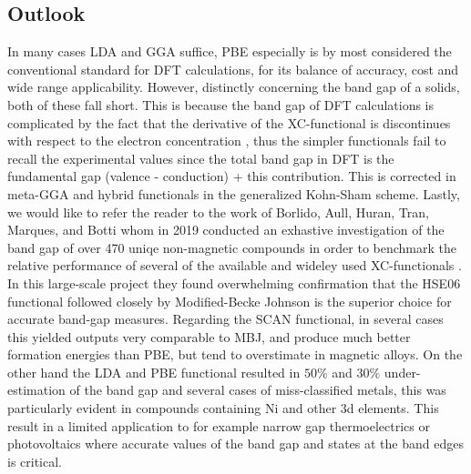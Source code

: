 \subsection{Outlook} 
 
In many cases LDA and GGA suffice, PBE especially is by most considered the conventional standard for DFT calculations, for its balance of accuracy, cost and wide range applicability. However, distinctly concerning the band gap of a solids, both of these fall short. This is because the band gap of DFT calculations is complicated by the fact that the derivative of the XC-functional is discontinues with respect to the electron concentration \cite{xc_derivative}, thus the simpler functionals fail to recall the experimental values since the total band gap in DFT is the fundamental gap (valence - conduction) + this contribution. This is corrected in meta-GGA and hybrid functionals in the generalized Kohn-Sham scheme. Lastly, we would like to refer the reader to the work of Borlido, Aull, Huran, Tran, Marques, and Botti whom in 2019 conducted an exhastive investigation of the band gap of over 470 uniqe non-magnetic compounds in order to benchmark the relative performance of several of the available and wideley used XC-functionals \cite{xc_benchmark}. In this large-scale project they found overwhelming confirmation that the HSE06 functional followed closely by Modified-Becke Johnson is the superior choice for accurate band-gap measures. Regarding the SCAN functional, in several cases this yielded outputs very comparable to MBJ, and produce much better formation energies than PBE, but tend to overstimate in magnetic alloys. On the other hand the LDA and PBE functional resulted in $50\%$ and $30\%$ under-estimation of the band gap and several cases of miss-classified metals, this was particularly evident in compounds containing Ni and other 3d elements. This result in a limited application to for example narrow gap thermoelectrics or photovoltaics where accurate values of the band gap and states at the band edges is critical.  
 

